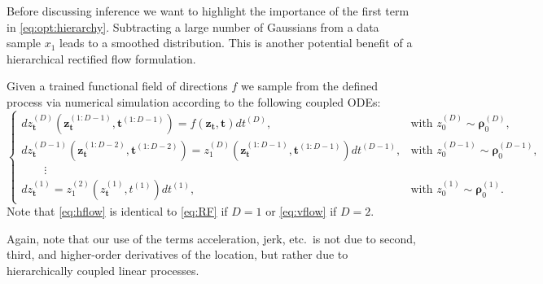 Before discussing inference we want to highlight the importance of the first term in \cref{eq:opt:hierarchy}. Subtracting a large number of Gaussians from a data sample $x_1$ leads to a smoothed distribution. This is another potential benefit of a hierarchical rectified flow formulation. 

Given a trained functional field of directions $f$ we  sample from the defined process via numerical simulation according to the following coupled ODEs:  
\begin{equation}
\label{eq:hflow}
\begin{cases}
   d z_{\bm{t}}^{(D)}\left(\bm{z}^{(1:D-1)}_{\bm{t}}, \bm{t}^{(1:D-1)}  \right)  = f (\bm{z}_{\bm{t}}, \bm{t}) dt^{(D)}, & \text{with } z_0^{(D)} \sim \boldsymbol{\rho}_0^{(D)},  \\
    d z_{\bm{t}}^{(D-1)} \left(\bm{z}^{(1:D-2)}_{\bm{t}}, \bm{t}^{(1:D-2)}  \right) = z_1^{(D)} \left(\bm{z}^{(1:D-1)}_{\bm{t}}, \bm{t}^{(1:D-1)}  \right) dt^{(D-1)}, & \text{with } z_0^{(D-1)} \sim \boldsymbol{\rho}^{(D-1)}_0,  \\
    \quad  \quad \vdots\\
   d z^{(1)}_{\bm t} = z_1^{(2)}\left (z^{(1)}_{\bm t}, t^{(1)} \right)dt^{(1)}, & \text{with } z_0^{(1)} \sim \boldsymbol{\rho}^{(1)}_0.
\end{cases}
\end{equation}
Note that \cref{eq:hflow} is identical to \cref{eq:RF} if $D=1$ or \cref{eq:vflow} if $D=2$.

Again, note that our use of the terms acceleration, jerk, etc.\ is not due to second, third, and higher-order derivatives of the location, but rather due to hierarchically coupled linear processes. %
